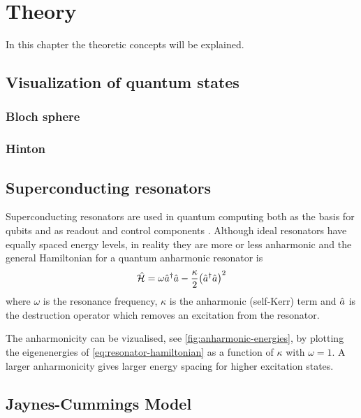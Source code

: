 \documentclass[main.tex]{subfiles}
\begin{document}
\chapter{Theory}
In this chapter the theoretic concepts will be explained.

\section{Visualization of quantum states}

\subsection{Bloch sphere}

\subsection{Hinton }

\section{Superconducting resonators}
Superconducting resonators are used in quantum computing both as the basis for qubits and as readout and control components \cite{}. Although ideal resonators have equally spaced energy levels, in reality they are more or less anharmonic and the general Hamiltonian for a quantum anharmonic resonator is
\begin{equation}
    \hat{\mathcal{H}} = \omega \hat{a}^\dagger\hat{a} - \frac{\kappa}{2} \qty(\hat{a}^\dagger\hat{a})^2
    \label{eq:resonator-hamiltonian}
\end{equation}
where \(\omega\) is the resonance frequency, \(\kappa\) is the anharmonic (self-Kerr) term and \(\hat{a}\) is the destruction operator which removes an excitation from the resonator.

The anharmonicity can be vizualised, see \cref{fig:anharmonic-energies}, by plotting the eigenenergies of \cref{eq:resonator-hamiltonian} as a function of \(\kappa\) with \(\omega=1\). A larger anharmonicity gives larger energy spacing for higher excitation states.


\section{Jaynes-Cummings Model}
\end{document}
